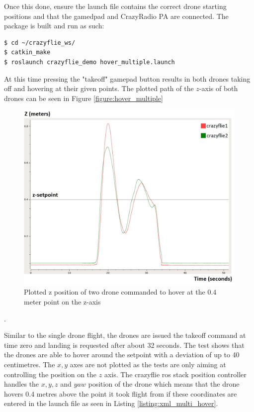 \noindent Once this done, ensure the launch file contains the correct drone starting positions and that the gamedpad and CrazyRadio PA are connected. The package is built and run as such:
\begin{verbatim}
$ cd ~/crazyflie_ws/
$ catkin_make
$ roslaunch crazyflie_demo hover_multiple.launch
\end{verbatim}

\noindent At this time pressing the "takeoff" gamepad button results in both drones taking off and hovering at their given points. The plotted path of the $z$-axis of both drones can be seen in Figure \ref{figure:hover_multiple}

\begin{figure}[H]
\centering
 \includegraphics[scale=0.25]{Figures/hover_multiple.jpg}
 \caption{Plotted z position of two drone commanded to hover at the 0.4 meter point on the z-axis}
 \label{figure:plot_hover_multiple}
\end{figure}.

\noindent Similar to the single drone flight, the drones are issued the takeoff command at time zero and landing is requested after about 32 seconds. The test shows that the drones are able to hover around the setpoint with a deviation of up to 40 centimetres. The $x,y$ axes are not plotted as the tests are only aiming at controlling the position on the $z$ axis. The crazyflie ros stack position controller handles the $x,y,z$ and $yaw$ position of the drone which means that the drone hovers 0.4 metres above the point it took flight from if these coordinates are entered in the launch file as seen in Listing \ref{listing:xml_multi_hover}.



